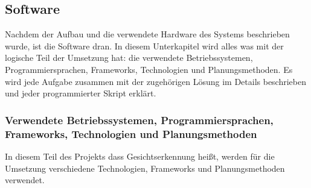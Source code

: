 	\subsection{Software}
Nachdem der Aufbau und die verwendete Hardware des Systems beschrieben wurde, ist die Software dran. In diesem Unterkapitel wird alles was mit der logische Teil der Umsetzung hat: die verwendete Betriebssystemen, Programmiersprachen, Frameworks, Technologien und Planungsmethoden. Es wird jede Aufgabe zusammen mit der zugehörigen Lösung im Details beschrieben und jeder programmierter Skript erklärt.
		\subsubsection{Verwendete Betriebssystemen, Programmiersprachen, Frameworks, Technologien und Planungsmethoden}
In diesem Teil des Projekts dass Gesichtserkennung heißt, werden für die Umsetzung verschiedene Technologien,  Frameworks und Planungsmethoden verwendet.
